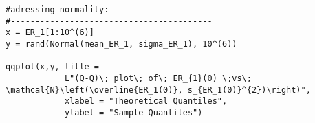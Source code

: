 \begin{verbatim}
#adressing normality:
#-----------------------------------------
x = ER_1[1:10^(6)]
y = rand(Normal(mean_ER_1, sigma_ER_1), 10^(6))

qqplot(x,y, title =  
            L"(Q-Q)\; plot\; of\; ER_{1}(0) \;vs\; \mathcal{N}\left(\overline{ER_1(0)}, s_{ER_1(0)}^{2})\right)", 
            xlabel = "Theoretical Quantiles", 
            ylabel = "Sample Quantiles")
\end{verbatim}



%


%


